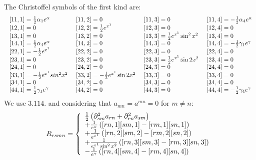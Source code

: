 The Christoffel symbols of the first kind are:
\begin{align}
\begin{array}{llll}
 \ [11,1]=\half\alpha _1 e^{\alpha}& \ [11,2]=0& \ [11,3]= 0& \ [11,4]=-\half\alpha _4 e^{\alpha} \\
 \ [12,1]=0& \ [12,2]=\half e^{x^1}& \ [12,3]= 0& \ [12,4]=0 \\
 \ [13,1]=0& \ [13,2]=0& \ [13,3]= \half e^{x^1}\sin^2 x^2& \ [13,4]=0\\
 \ [14,1]=\half\alpha _4 e^{\alpha}& \ [14,2]=0& \ [14,3]= 0& \ [14,4]=-\half\gamma _1 e^{\gamma} \\
 \ [22,1]=-\half e^{x^1}& \ [22,2]=0& \ [22,3]= 0& \ [22,4]=0\\
 \ [23,1]=0& \ [23,2]=0& \ [23,3]= \half e^{x^1}\sin 2x^2  & \ [23,4]=0\\
 \ [24,1]=0& \ [24,2]=0& \ [24,3]= 0& \ [24,4]=0 \\
 \ [33,1]=-\half e^{x^1}sin^2 x^2& \ [33,2]=-\half e^{x^1}\sin 2x^2 & \ [33,3]= 0& \ [33,4]=0\\
 \ [34,1]=0& \ [34,2]=0& \ [34,3]= 0& \ [34,4]=0 \\
 \ [44,1]=\half \gamma _1 e^{\gamma}& \ [44,2]=0& \ [44,3]= 0& \ [44,4]=-\half\gamma _4 e^{\gamma} \\
\end{array}
\end{align}
We use $3.114.$ and considering that $a_{mn}= a^{mn}= 0$ for $m\ne n$: $$R_{rsmn}= \left\{\begin{array}{l}
\frac{1}{2}\left(\partial^2_{sm}a_{rn}+\partial^2_{rn}a_{sm}\right)\\
+ \frac{1}{e^{\alpha}}\left( [rn,1] [sm,1] -[rm,1] [sn,1]  \right)\\
+ \frac{1}{e^{x^1}}\left([rn,2] [sm,2] -[rm,2][sn,2] \right)\\
+ \frac{1}{e^{x^1}\sin^2 x^2}\left( [rn,3][sm,3]-[rm,3][sn,3]  \right)\\
-\frac{1}{e^{\gamma}}\left( [rn,4][sm,4] -[rm,4][sn,4]  \right)
\end{array}\right.$$\\


